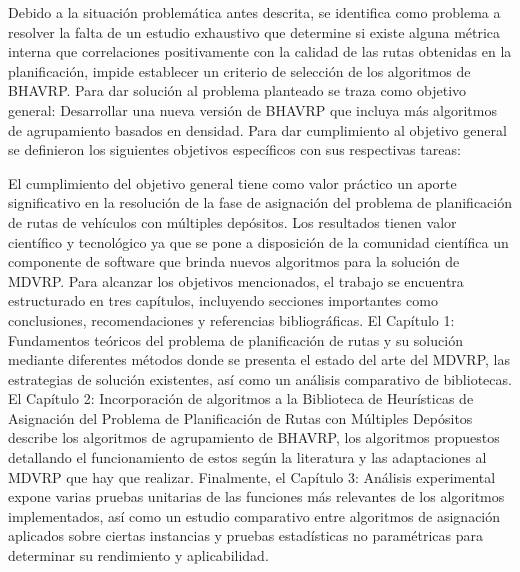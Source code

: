 Debido a la situación problemática antes descrita, se identifica como problema a resolver la falta de un estudio exhaustivo que determine si existe alguna métrica interna que correlaciones positivamente con la calidad de las rutas obtenidas en la planificación, impide establecer un criterio de selección de los algoritmos de BHAVRP.
Para dar solución al problema planteado se traza como objetivo general: Desarrollar una nueva versión de BHAVRP que incluya más algoritmos de agrupamiento basados en densidad.
Para dar cumplimiento al objetivo general se definieron los siguientes objetivos específicos con sus respectivas tareas:


El cumplimiento del objetivo general tiene como valor práctico un aporte significativo en la resolución de la fase de asignación del problema de planificación de rutas de vehículos con múltiples depósitos. Los resultados tienen valor científico y tecnológico ya que se pone a disposición de la comunidad científica un componente de software que brinda nuevos algoritmos para la solución de MDVRP.
Para alcanzar los objetivos mencionados, el trabajo se encuentra estructurado en tres capítulos, incluyendo secciones importantes como conclusiones, recomendaciones y referencias bibliográficas. El Capítulo 1: Fundamentos teóricos del problema de planificación de rutas y su solución mediante diferentes métodos donde se presenta el estado del arte del MDVRP, las estrategias de solución existentes, así como un análisis comparativo de bibliotecas. El Capítulo 2: Incorporación de algoritmos a la Biblioteca de Heurísticas de Asignación del Problema de Planificación de Rutas con Múltiples Depósitos describe los algoritmos de agrupamiento de BHAVRP, los algoritmos propuestos detallando el funcionamiento de estos según la literatura y las adaptaciones al MDVRP que hay que realizar. Finalmente, el Capítulo 3: Análisis experimental expone varias pruebas unitarias de las funciones más relevantes de los algoritmos implementados, así como un estudio comparativo entre algoritmos de asignación aplicados sobre ciertas instancias y pruebas estadísticas no paramétricas para determinar su rendimiento y aplicabilidad.
